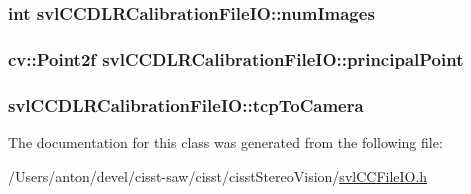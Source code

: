 \subsubsection[{num\+Images}]{\setlength{\rightskip}{0pt plus 5cm}int svl\+C\+C\+D\+L\+R\+Calibration\+File\+I\+O\+::num\+Images}\label{classsvl_c_c_d_l_r_calibration_file_i_o_aea95d20c4c61996153cb1ca3732f7f00}
\hypertarget{classsvl_c_c_d_l_r_calibration_file_i_o_abc46a8c4ff95eaeded6947fd20a37b29}{}
\subsubsection[{principal\+Point}]{\setlength{\rightskip}{0pt plus 5cm}cv\+::\+Point2f svl\+C\+C\+D\+L\+R\+Calibration\+File\+I\+O\+::principal\+Point}\label{classsvl_c_c_d_l_r_calibration_file_i_o_abc46a8c4ff95eaeded6947fd20a37b29}
\hypertarget{classsvl_c_c_d_l_r_calibration_file_i_o_ac4ceadd11cc10224168d3826060d7ceb}{}
\subsubsection[{tcp\+To\+Camera}]{ svl\+C\+C\+D\+L\+R\+Calibration\+File\+I\+O\+::tcp\+To\+Camera}\label{classsvl_c_c_d_l_r_calibration_file_i_o_ac4ceadd11cc10224168d3826060d7ceb}


The documentation for this class was generated from the following file\+:\begin{DoxyCompactItemize}
\item 
/\+Users/anton/devel/cisst-\/saw/cisst/cisst\+Stereo\+Vision/\hyperlink{svl_c_c_file_i_o_8h}{svl\+C\+C\+File\+I\+O.\+h}\end{DoxyCompactItemize}
